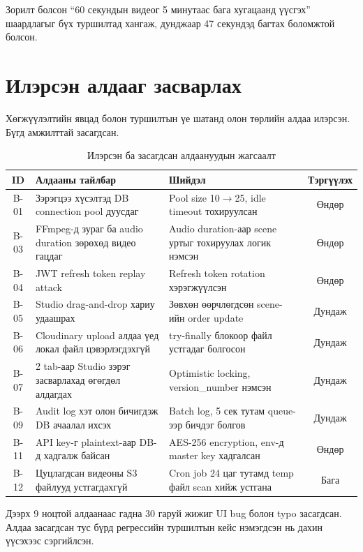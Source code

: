 Зорилт болсон ``60 секундын видеог 5 минутаас бага хугацаанд үүсгэх'' шаардлагыг бүх туршилтад хангаж, дунджаар 47 секундэд багтах боломжтой болсон.

\section{Илэрсэн алдааг засварлах}

Хөгжүүлэлтийн явцад болон туршилтын үе шатанд олон төрлийн алдаа илэрсэн. Бүгд амжилттай засагдсан.

\begin{table}[H]
\centering
\label{tab:bugs}
\begin{tabular}{|c|p{3.5cm}|p{5cm}|c|}
\hline
\textbf{ID} & \textbf{Алдааны тайлбар} & \textbf{Шийдэл} & \textbf{Тэргүүлэх} \\
\hline
B-01 & Зэрэгцээ хүсэлтэд DB connection pool дуусдаг & Pool size 10$\to$25, idle timeout тохируулсан & Өндөр \\
\hline
B-03 & FFmpeg-д зураг ба audio duration зөрөхөд видео гацдаг & Audio duration-аар scene уртыг тохируулах логик нэмсэн & Өндөр \\
\hline
B-04 & JWT refresh token replay attack & Refresh token rotation хэрэгжүүлсэн & Өндөр \\
\hline
B-05 & Studio drag-and-drop хариу удаашрах & Зөвхөн өөрчлөгдсөн scene-ийн order update & Дундаж \\
\hline
B-06 & Cloudinary upload алдаа үед локал файл цэвэрлэгдэхгүй & try-finally блокоор файл устгадаг болгосон & Дундаж \\
\hline
B-07 & 2 tab-аар Studio зэрэг засварлахад өгөгдөл алдагдах & Optimistic locking, version\_number нэмсэн & Дундаж \\
\hline
B-09 & Audit log хэт олон бичигдэж DB ачаалал ихсэх & Batch log, 5 сек тутам queue-ээр бичдэг болгов & Дундаж \\
\hline
B-11 & API key-г plaintext-аар DB-д хадгалж байсан & AES-256 encryption, env-д master key хадгалсан & Өндөр \\
\hline
B-12 & Цуцлагдсан видеоны S3 файлууд устгагдахгүй & Cron job 24 цаг тутамд temp файл scan хийж устгана & Бага \\
\hline
\end{tabular}
\caption{Илэрсэн ба засагдсан алдаануудын жагсаалт}
\end{table}

Дээрх 9 ноцтой алдаанаас гадна 30 гаруй жижиг UI bug болон typo засагдсан. Алдаа засагдсан тус бүрд регрессийн туршилтын кейс нэмэгдсэн нь дахин үүсэхээс сэргийлсэн.

